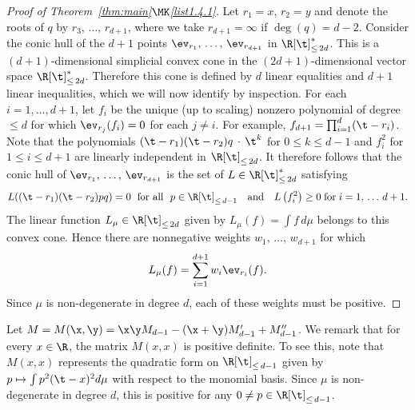 \begin{proof}[Proof of Theorem~\ref{thm:main}$\MK$\eqref{list1.4.1}]
Let $r_1=x$, $r_2=y$ and denote the roots of $q$ by $r_3,\,\hdots,\,r_{d+1}$, where we take $r_{d+1}=\infty$ if $\deg(q) = d-2$. Consider the conic hull of the $d+1$ points $\ev_{r_1},\,\hdots,\,\ev_{r_{d+1}}$ in $\R[\t]_{\leq\,2d}^*$. This is a $(d+1)$-dimensional simplicial convex cone in the $(2d+1)$-dimensional vector space $\R[\t]_{\leq\,2d}^*$. Therefore this cone is defined by $d$ linear equalities and $d+1$ linear inequalities, which we will now identify by inspection. For each $i=1, \hdots, d+1$, let $f_i$ be the unique (up to scaling) nonzero polynomial of degree $\leq d$ for which $\ev_{r_j}(f_i) = 0$ for each $j\neq i$. For example, $f_{d+1} =
\prod_{i=1}^{d}(\t-r_i)$. Note that the polynomials $(\t-r_1)(\t-r_2)q\,\cdot\,
\t^k$ for $0\le k\le d-1$ and $f_i^2$ for $1\le i\le d+1$ are linearly independent in $\R[\t]_{\leq\,2d}$. It therefore follows that the conic hull of $\ev_{r_1},\,\hdots,\, \ev_{r_{d+1}}$ is the set of $L\in \R[\t]_{\leq\,2d}^*$ satisfying
\[
L((\t-r_1)(\t-r_2)pq) = 0 \; \text{ for all } \ p \in \R[\t]_{\leq\,d-1}
\quad\text{and} \quad L\left(f_i^2\right) \geq 0 \; \text{for} \; i=1,\,\hdots\,d+1.
\]
The linear function $L_{\mu}\in \R[\t]_{\leq\, 2d}$ given by $L_{\mu}(f) = \int f\, d\mu$ belongs to this convex cone. Hence there are nonnegative weights $w_1,\,\hdots,\,w_{d+1}$ for which
\[
L_{\mu}(f) = \sum_{i=1}^{d+1}w_i \ev_{r_i}(f).
\]
Since $\mu$ is non-degenerate in degree $d$, each of these weights must be positive.
\end{proof}



\begin{rema}\label{rem:PDdiag}
Let $M = M(\x, \y) = \x\y M_{d-1}-(\x+\y)M'_{d-1}+ M''_{d-1}$. We remark that for every $x\in \R$, the matrix $M(x,x)$ is positive definite. To see this, note that $M(x,x)$ represents the quadratic form on $\R[\t]_{\leq\,d-1}$ given by $p \mapsto \int p^2(\t-x)^2 d\mu$ with respect to the monomial basis. Since $\mu$ is non-degenerate in degree $d$, this is positive for any $0\neq p \in \R[\t]_{\leq\,d-1}$.
\end{rema}


